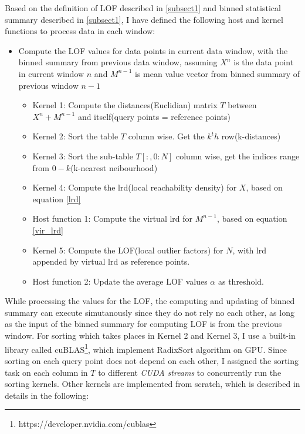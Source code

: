 \documentclass[11pt]{article}       %
\begin{document}
Based on the definition of LOF described in \ref{subsect1} and binned statistical summary described in \ref{subsect1}, I have defined the following host and kernel functions to process data in each window:

\begin{itemize}
	\item Compute the LOF values for data points in current data window, with the binned summary from previous data window, assuming $X^n$ is the data point in current window $n$ and $M^{n-1}$ is mean value vector from binned summary of previous window $n-1$
		\begin{itemize}
			\item Kernel 1: Compute the distances(Euclidian) matrix $T$ between $X^n + M^{n-1}$ and itself(query points = reference points)
			\item Kernel 2: Sort the table $T$ column wise. Get the $k^th$ row(k-distances)
			\item Kernel 3: Sort the sub-table $T[:,0:N]$ column wise, get the indices range from $0 - k$(k-nearest neibourhood)			
			\item Kernel 4: Compute the lrd(local reachability density) for $X$, based on equation \ref{lrd}
			\item Host function 1: Compute the virtual lrd for $M^{n-1}$, based on equation \ref{vir_lrd}
			\item Kernel 5: Compute the LOF(local outlier factors) for $N$, with lrd appended by virtual lrd as reference points.
			\item Host function 2: Update the average LOF values $\alpha$ as threshold.
		\end{itemize}	
\end{itemize}

While processing the values for the LOF, the computing and updating of binned summary can execute simutanously since they do not rely no each other, as long as the input of the binned summary for computing LOF is from the previous window. For sorting which takes places in Kernel 2 and Kernel 3, I use a built-in library called cuBLAS\footnote{https://developer.nvidia.com/cublas}, which implement RadixSort algorithm on GPU. Since sorting on each query point does not depend on each other, I assigned the sorting task on each column in $T$ to different \textit{CUDA streams} to concurrently run the sorting kernels. Other kernels are implemented from scratch, which is described in details in the following:
\end{document}
